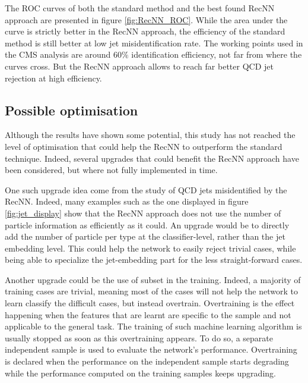 The ROC curves of both the standard method and the best found RecNN approach are presented in figure \ref{fig:RecNN_ROC}. While the area under the curve is strictly better in the RecNN approach, the efficiency of the standard method is still better at low jet misidentification rate. The working points used in the CMS analysis are around 60$\%$ identification efficiency, not far from where the curves cross. But the RecNN approach allows to reach far better QCD jet rejection at high \tauh efficiency.

\subsection{Possible optimisation}

Although the results have shown some potential, this study has not reached the level of optimisation that could help the RecNN to outperform the standard technique. Indeed, several upgrades that could benefit the RecNN approach have been considered, but where not fully implemented in time. 

One such upgrade idea come from the study of QCD jets misidentified by the RecNN. Indeed, many examples such as the one displayed in figure \ref{fig:jet_display} show that the RecNN approach does not use the number of particle information as efficiently as it could. An upgrade would be to directly add the number of particle per type at the classifier-level, rather than the jet embedding level. This could help the network to easily reject trivial cases, while being able to specialize the jet-embedding part for the less straight-forward cases.

Another upgrade could be the use of subset in the training. Indeed, a majority of training cases are trivial, meaning most of the cases will not help the network to learn classify the difficult cases, but instead overtrain. Overtraining is the effect happening when the features that are learnt are specific to the sample and not applicable to the general task. The training of such machine learning algorithm is usually stopped as soon as this overtraining appears. To do so, a separate independent sample is used to evaluate the network's performance. Overtraining is declared when the performance on the independent sample starts degrading while the performance computed on the training samples keeps upgrading.


